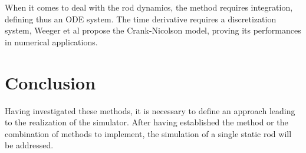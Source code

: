 \documentclass{thesisreport}
\begin{document}
 When it comes to deal with the rod dynamics, the method requires integration, defining thus an ODE system. The time derivative requires a discretization system, Weeger et al \cite{weeger_isogeometric_2018} propose the Crank-Nicolson model, proving its performances in numerical applications. 


 \chapter*{Conclusion}
 Having investigated these methods, it is necessary to define an approach leading to the realization of the simulator. After having established the method or the combination of methods to implement, the simulation of a single static rod will be addressed. 
 
 

 
 
 
 
 
 
\end{document}
